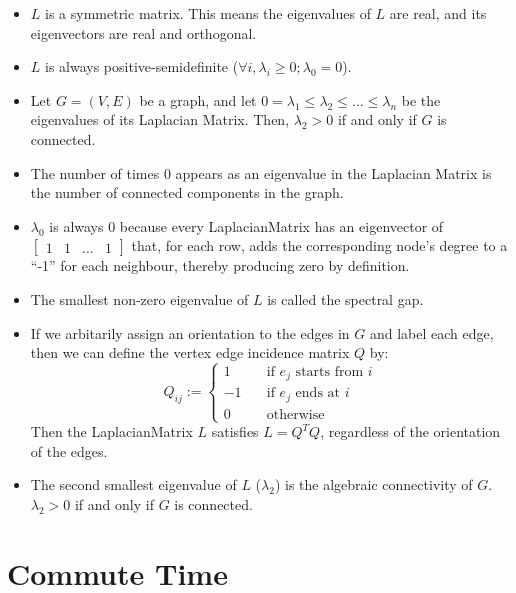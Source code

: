 \begin{itemize}
\item $L$ is a symmetric matrix. This means the eigenvalues of $L$ are real, and
its eigenvectors are real and orthogonal.
\item $L$ is always positive-semidefinite ($\forall i, \lambda_{i} \geq 0; 
\lambda_{0} = 0$).
\item Let $G = (V,E)$ be a graph, and let $0 = \lambda_{1} \leq \lambda_{2}
\leq \ldots \leq \lambda_{n}$ be the eigenvalues of its Laplacian Matrix. Then, 
$\lambda_{2} > 0$ if and only if $G$ is connected.
\item The number of times $0$ appears as an eigenvalue in the Laplacian Matrix 
is the number of connected components in the graph.
\item $\lambda_{0}$ is always $0$ because every \gls{LaplacianMatrix} has an 
eigenvector of $\begin{bmatrix} 1 & 1 & \ldots & 1 \end{bmatrix}$ that, for each
row, adds the corresponding node's degree to a ``-1'' for each neighbour, 
thereby producing zero by definition.
\item The smallest non-zero eigenvalue of $L$ is called the spectral gap.
\item If we arbitarily assign an orientation to the edges in $G$ and label each
edge, then we can define the vertex edge incidence matrix $Q$ by:
\begin{displaymath}
Q_{ij} := 
    \left\{
        \begin{array}{ll}
            1 &     \quad \text{if $e_{j}$ starts from $i$} \\
            -1 &    \quad \text{if $e_{j}$ ends at $i$} \\
            0 &     \quad \text{otherwise}
        \end{array}
    \right.
\end{displaymath}
Then the \gls{LaplacianMatrix} $L$ satisfies $L = Q^{T}Q$, regardless of the 
orientation of the edges.
\item The second smallest eigenvalue of $L$ ($\lambda_{2}$) is the algebraic 
connectivity of $G$. $\lambda_{2} > 0$ if and only if $G$ is connected.
\end{itemize}

\section{Commute Time}

